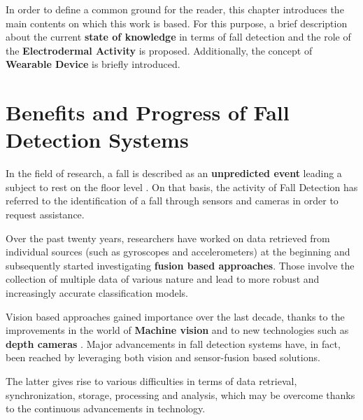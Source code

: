 \label{ch:background}

In order to define a common ground for the reader, this chapter introduces the main contents on which this work is based. For this purpose, a brief description about the current \textbf{state of knowledge} in terms of fall detection and the role of the \textbf{Electrodermal Activity} is proposed. Additionally, the concept of \textbf{Wearable Device} is briefly introduced.

\section{Benefits and Progress of Fall Detection Systems }\label{sec:fallintro}

In the field of research, a fall is described as an \textbf{unpredicted event} leading a subject to rest on the floor level \cite{Lamb1}. On that basis, the activity of Fall Detection has referred to the identification of a fall through sensors and cameras in order to request assistance.

Over the past twenty years, researchers have worked on data retrieved from individual sources (such as gyroscopes and accelerometers) at the beginning and subsequently started investigating \textbf{fusion based approaches}. Those involve the collection of multiple data of various nature and lead to more robust and increasingly accurate classification models. 

Vision based approaches gained importance over the last decade, thanks to the improvements in the world of \textbf{Machine vision} and to new technologies such as \textbf{depth cameras} \cite{elderlySurvey}. Major advancements in fall detection systems have, in fact, been reached by leveraging both vision and sensor-fusion based solutions. 

The latter gives rise to various difficulties in terms of data retrieval, synchronization, storage, processing and analysis, which may be overcome thanks to the continuous advancements in technology.


